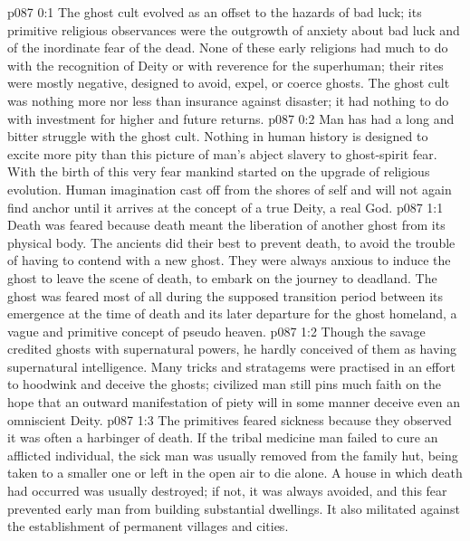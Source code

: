 \author{Brilliant Evening Star}
\vs p087 0:1 The ghost cult evolved as an offset to the hazards of bad luck; its primitive religious observances were the outgrowth of anxiety about bad luck and of the inordinate fear of the dead. None of these early religions had much to do with the recognition of Deity or with reverence for the superhuman; their rites were mostly negative, designed to avoid, expel, or coerce ghosts. The ghost cult was nothing more nor less than insurance against disaster; it had nothing to do with investment for higher and future returns.
\vs p087 0:2 Man has had a long and bitter struggle with the ghost cult. Nothing in human history is designed to excite more pity than this picture of man’s abject slavery to ghost\hyp{}spirit fear. With the birth of this very fear mankind started on the upgrade of religious evolution. Human imagination cast off from the shores of self and will not again find anchor until it arrives at the concept of a true Deity, a real God.
\vs p087 1:1 Death was feared because death meant the liberation of another ghost from its physical body. The ancients did their best to prevent death, to avoid the trouble of having to contend with a new ghost. They were always anxious to induce the ghost to leave the scene of death, to embark on the journey to deadland. The ghost was feared most of all during the supposed transition period between its emergence at the time of death and its later departure for the ghost homeland, a vague and primitive concept of pseudo heaven.
\vs p087 1:2 Though the savage credited ghosts with supernatural powers, he hardly conceived of them as having supernatural intelligence. Many tricks and stratagems were practised in an effort to hoodwink and deceive the ghosts; civilized man still pins much faith on the hope that an outward manifestation of piety will in some manner deceive even an omniscient Deity.
\vs p087 1:3 The primitives feared sickness because they observed it was often a harbinger of death. If the tribal medicine man failed to cure an afflicted individual, the sick man was usually removed from the family hut, being taken to a smaller one or left in the open air to die alone. A house in which death had occurred was usually destroyed; if not, it was always avoided, and this fear prevented early man from building substantial dwellings. It also militated against the establishment of permanent villages and cities.
